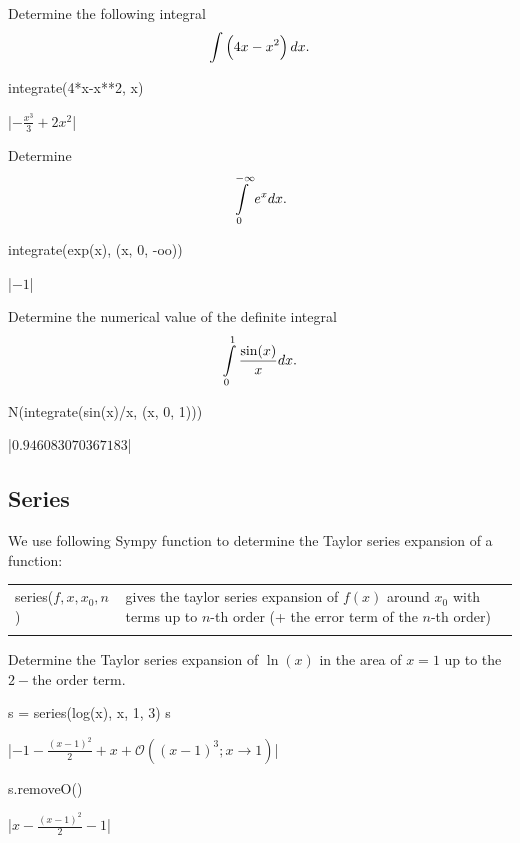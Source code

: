\begin{example}
	Determine the following integral
	  $$ \displaystyle\int\left(4x - x^2\right) dx.$$
\begin{pyin}
    integrate(4*x-x**2, x)
\end{pyin}
\begin{pyout}
    |$-\frac{x^3}{3}+2x^2$|
\end{pyout}
	Determine 
	 $$\displaystyle\int\limits^{-\infty}_0 e^x dx.$$

\begin{pyin}
    integrate(exp(x), (x, 0, -oo))
\end{pyin}
\begin{pyout}
    |$-1$|
\end{pyout}

	Determine the numerical value of the definite integral  $$\displaystyle\int\limits^{1}_0 \frac{\sin(x)}{x} dx.$$
	
\begin{pyin}
    N(integrate(sin(x)/x, (x, 0, 1)))
\end{pyin}
\begin{pyout}
    |$0.946083070367183$|
\end{pyout}
\end{example}

\subsection{Series}
We use following Sympy function to determine the Taylor series expansion of a function:	

\begin{tabular}{>{\hfill}p{5cm}p{12cm}}
	series($f,x,x_0,n$)						&			gives the taylor series expansion of $f(x)$ around $x_0$ with terms up to $n$-th order (+ the error term of the $n$-th order)\\
	\multicolumn{2}{l}{} 
\end{tabular}

\begin{example}
	Determine the Taylor series expansion of $\ln(x)$ in the area of  $x=1$ up to the $2-$the order term. 

\begin{pyin}
    s = series(log(x), x, 1, 3)
    s
\end{pyin}
\begin{pyout}
    |$-1-\frac{(x-1)^2}{2}+x+\mathcal{O}((x-1)^3; x\rightarrow1)$|
\end{pyout}

\begin{pyin}
    s.removeO()
\end{pyin}
\begin{pyout}
    |$x-\frac{(x-1)^2}{2}-1$|
\end{pyout}
\end{example}
